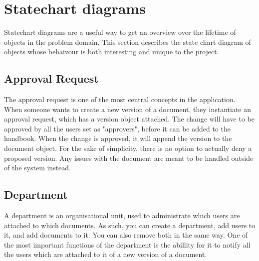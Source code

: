 \section{Statechart diagrams} \label{sec:statechart}
Statechart diagrams are a useful way to get an overview over the lifetime of objects in the problem domain.
This section describes the state chart diagram of objects whose behaivour is both interesting and unique to the project.

\subsection{Approval Request}
The approval request is one of the most central concepts in the application.
When someone wants to create a new version of a document, they instantiate an approval request, which has a version object attached.
The change will have to be approved by all the users set as "approvers", before it can be added to the handbook.
When the change is approved, it will append the version to the document object.
For the sake of simplicity, there is no option to actually deny a proposed version.
Any issues with the document are meant to be handled outside of the system instead.


\subsection{Department}
A department is an organisational unit, used to administrate which users are attached to which documents.
As such, you can create a department, add users to it, and add documents to it.
You can also remove both in the same way.
One of the most important functions of the department is the abillity for it to notify all the users which are attached to it of a new version of a document.


